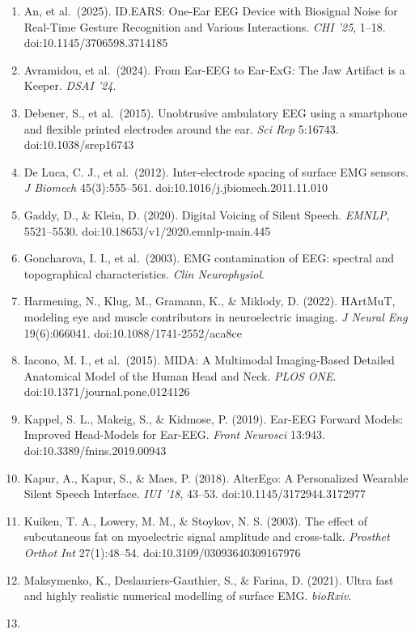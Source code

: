 \documentclass[
  11pt,
  a4paper,
]{article}
\providecommand{\tightlist}{%
  \setlength{\itemsep}{0pt}\setlength{\parskip}{0pt}}
\providecommand{\tightlist}{%
  \setlength{\itemsep}{0pt}\setlength{\parskip}{0pt}}
\begin{document}
\begin{enumerate}
\def\labelenumi{\arabic{enumi}.}
\tightlist
\item
  An, et al.~(2025). ID.EARS: One-Ear EEG Device with Biosignal Noise for Real-Time Gesture Recognition and Various Interactions. \emph{CHI '25}, 1--18. doi:10.1145/3706598.3714185
\item
  Avramidou, et al.~(2024). From Ear-EEG to Ear-ExG: The Jaw Artifact is a Keeper. \emph{DSAI '24}.
\item
  Debener, S., et al.~(2015). Unobtrusive ambulatory EEG using a smartphone and flexible printed electrodes around the ear. \emph{Sci Rep} 5:16743. doi:10.1038/srep16743
\item
  De Luca, C. J., et al.~(2012). Inter-electrode spacing of surface EMG sensors. \emph{J Biomech} 45(3):555--561. doi:10.1016/j.jbiomech.2011.11.010
\item
  Gaddy, D., \& Klein, D. (2020). Digital Voicing of Silent Speech. \emph{EMNLP}, 5521--5530. doi:10.18653/v1/2020.emnlp-main.445
\item
  Goncharova, I. I., et al.~(2003). EMG contamination of EEG: spectral and topographical characteristics. \emph{Clin Neurophysiol}.
\item
  Harmening, N., Klug, M., Gramann, K., \& Miklody, D. (2022). HArtMuT, modeling eye and muscle contributors in neuroelectric imaging. \emph{J Neural Eng} 19(6):066041. doi:10.1088/1741-2552/aca8ce
\item
  Iacono, M. I., et al.~(2015). MIDA: A Multimodal Imaging-Based Detailed Anatomical Model of the Human Head and Neck. \emph{PLOS ONE}. doi:10.1371/journal.pone.0124126
\item
  Kappel, S. L., Makeig, S., \& Kidmose, P. (2019). Ear-EEG Forward Models: Improved Head-Models for Ear-EEG. \emph{Front Neurosci} 13:943. doi:10.3389/fnins.2019.00943
\item
  Kapur, A., Kapur, S., \& Maes, P. (2018). AlterEgo: A Personalized Wearable Silent Speech Interface. \emph{IUI '18}, 43--53. doi:10.1145/3172944.3172977
\item
  Kuiken, T. A., Lowery, M. M., \& Stoykov, N. S. (2003). The effect of subcutaneous fat on myoelectric signal amplitude and cross-talk. \emph{Prosthet Orthot Int} 27(1):48--54. doi:10.3109/03093640309167976
\item
  Maksymenko, K., Deslauriers-Gauthier, S., \& Farina, D. (2021). Ultra fast and highly realistic numerical modelling of surface EMG. \emph{bioRxiv}.
\item

\end{enumerate}
\end{document}
